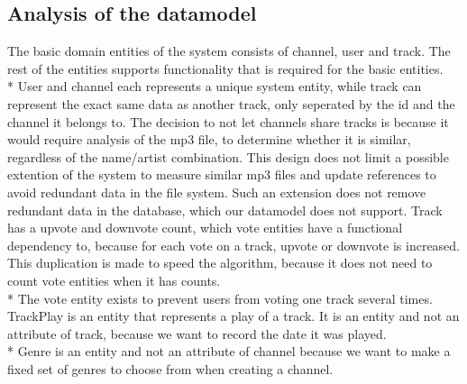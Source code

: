 \documentclass[a4paper,11pt,report]{article}
\begin{document}
\subsection{Analysis of the datamodel}
The basic domain entities of the system consists of channel, user and track. The rest of the entities supports functionality that is required for the basic entities. \\*
User and channel each represents a unique system entity, while track can represent the exact same data as another track, only seperated by the id and the channel it belongs to.
The decision to not let channels share tracks is because it would require analysis of the mp3 file, to determine whether it is similar, regardless of the name/artist combination.
This design does not limit a possible extention of the system to measure similar mp3 files and update references to avoid redundant data in the file system.
Such an extension does not remove redundant data in the database, which our datamodel does not support. Track has a upvote and downvote count, which vote entities have a functional dependency to,
because for each vote on a track, upvote or downvote is increased. This duplication is made to speed the algorithm, because it does not need to count vote entities when it has counts. \\*
The vote entity exists to prevent users from voting one track several times.
TrackPlay is an entity that represents a play of a track. It is an entity and not an attribute of track, because we want to record the date it was played. \\*
Genre is an entity and not an attribute of channel because we want to make a fixed set of genres to choose from when creating a channel. 
\end{document}

